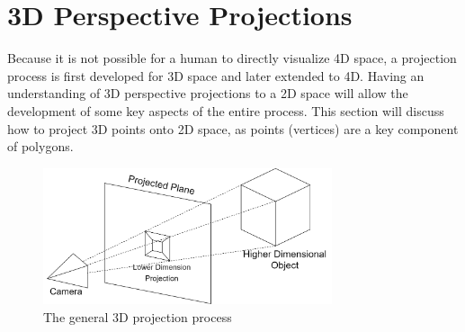 \documentclass[12pt, letterpaper]{article}
\begin{document}
\section{3D Perspective Projections}
 Because it is not possible for a human to directly visualize 4D space, a projection process is first developed for 3D space and later extended to 4D. Having an understanding of 3D perspective projections to a 2D space will allow the development of some key aspects of the entire process. This section will discuss how to project 3D points onto 2D space, as points (vertices) are a key component of polygons.
\begin{figure}[H]
\centering
\includegraphics[width=8.5cm]{3d_projection_diagram.png}
\caption{The general 3D projection process}
\label{fig:figure}
\end{figure} 
\end{document}
